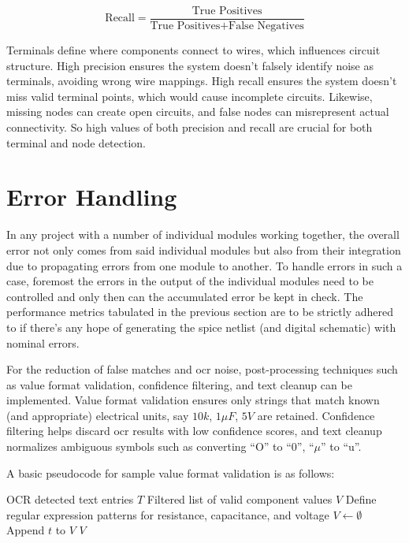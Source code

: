 \begin{equation}
\text{Recall} = \frac{\text{True Positives}}{\text{True Positives} + \text{False Negatives}}
\label{eq:recall}
\end{equation}

Terminals define where components connect to wires, which influences circuit structure. High precision ensures the system doesn't falsely identify noise as terminals, avoiding wrong wire mappings. High recall ensures the system doesn't miss valid terminal points, which would cause incomplete circuits. Likewise, missing nodes can create open circuits, and false nodes can misrepresent actual connectivity. So high values of both precision and recall are crucial for both terminal and node detection.

\section{Error Handling}

In any project with a number of individual modules working together, the overall error not only comes from said individual modules but also from their integration due to propagating errors from one module to another. To handle errors in such a case, foremost the errors in the output of the individual modules need to be controlled and only then can the accumulated error be kept in check. The performance metrics tabulated in the previous section are to be strictly adhered to if there's any hope of generating the \gls{spice} netlist (and digital schematic) with nominal errors.

For the reduction of false matches and \gls{ocr} noise, post-processing techniques such as value format validation, confidence filtering, and text cleanup can be implemented. Value format validation ensures only strings that match known (and appropriate) electrical units, say $10k$, $1\mu F$, $5V$ are retained. Confidence filtering helps discard \gls{ocr} results with low confidence scores, and text cleanup normalizes ambiguous symbols such as converting ``O'' to ``0'', ``$\mu$'' to ``u''.

A basic pseudocode for sample value format validation is as follows:

\begin{algorithm}
\caption{Validation and Filtering of OCR Component Values}
\label{algo:ocr-validation}
\begin{algorithmic}
\Require OCR detected text entries $T$
\Ensure Filtered list of valid component values $V$
\State Define regular expression patterns for resistance, capacitance, and voltage
\State $V \leftarrow \emptyset$
        \State Append $t$ to $V$
    \EndIf
\EndFor
\State \Return $V$
\end{algorithmic}
\end{algorithm}

